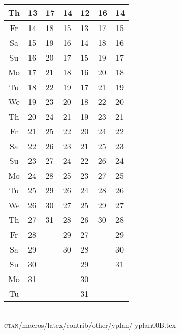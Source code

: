 \documentclass[a4paper]{article}
\def\Mo{Mo}
\def\Tu{Tu}
\def\We{We}
\def\Th{Th}
\def\Fr{Fr}
\def\Sa{Sa}
\def\Su{Su}
\newcommand{\datestrut}{\rule{0pt}{12pt}}
\begin{document}
\begin{table}
\begin{tabular}{|c||p{2.5cm}|p{2.5cm}|p{2.5cm}|p{2.5cm}|p{2.5cm}|p{2.5cm}|}
\hline
\datestrut \Th & 13  & 17  & 14  & 12 &  16  & 14   \\
\hline
\datestrut \Fr & 14  & 18  & 15  & 13 &  17  & 15   \\
\hline
\datestrut \Sa & 15  & 19  & 16  & 14 &  18  & 16   \\
\hline
\datestrut \Su & 16  & 20  & 17  & 15 &  19  & 17   \\
\hline\hline
\datestrut \Mo & 17  & 21  & 18  & 16 &  20  & 18   \\
\hline
\datestrut \Tu & 18  & 22  & 19  & 17 &  21  & 19   \\
\hline
\datestrut \We & 19  & 23  & 20  & 18 &  22  & 20   \\
\hline
\datestrut \Th & 20  & 24  & 21  & 19 &  23  & 21   \\
\hline
\datestrut \Fr & 21  & 25  & 22  & 20 &  24  & 22   \\
\hline
\datestrut \Sa & 22  & 26  & 23  & 21 &  25  & 23   \\
\hline
\datestrut \Su & 23  & 27  & 24  & 22 &  26  & 24   \\
\hline\hline
\datestrut \Mo & 24  & 28  & 25  & 23 &  27  & 25   \\
\hline
\datestrut \Tu & 25  & 29  & 26  & 24 &  28  & 26   \\
\hline
\datestrut \We & 26  & 30  & 27  & 25 &  29  & 27   \\
\hline
\datestrut \Th & 27  & 31  & 28  & 26 &  30  & 28   \\
\hline
\datestrut \Fr & 28  &     & 29  & 27 &      & 29   \\
\cline{1-2}\cline{4-5}\cline{7-7}
\datestrut \Sa & 29  &     & 30  & 28 &      & 30   \\
\cline{1-2}\cline{4-5}\cline{7-7}
\datestrut \Su & 30  &     &     & 29 &      & 31   \\
\hline\hline
\datestrut \Mo & 31  &     &     & 30 &      &      \\
\cline{1-2}\cline{5-5}
\datestrut \Tu &     &     &     & 31 &      &      \\
\hline
\end{tabular}
{\ }    \\
\textsc{ctan}/macros/latex/contrib/other/yplan/%
yplan00B.tex%
\end{table}
\end{document}
